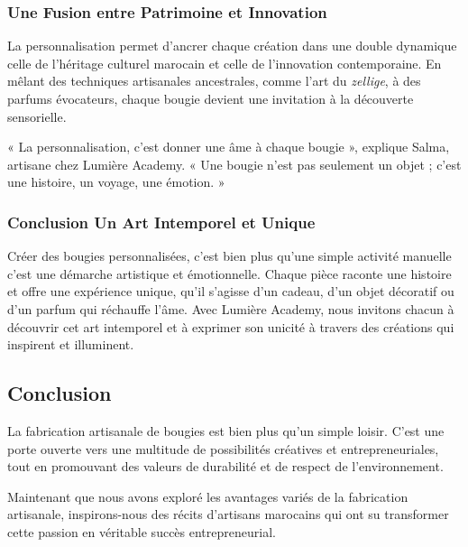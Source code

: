 \documentclass[11pt,fleqn,onecolumn,oneside]{book}
\begin{document}
\subsubsection*{Une Fusion entre Patrimoine et Innovation}

La personnalisation permet d’ancrer chaque création dans une double dynamique celle de l’héritage culturel marocain et celle de l’innovation contemporaine. En mêlant des techniques artisanales ancestrales, comme l’art du \textit{zellige}, à des parfums évocateurs, chaque bougie devient une invitation à la découverte sensorielle.

\begin{remark}
« La personnalisation, c’est donner une âme à chaque bougie », explique Salma, artisane chez Lumière Academy. « Une bougie n’est pas seulement un objet ; c’est une histoire, un voyage, une émotion. »
\end{remark}

\subsubsection*{Conclusion Un Art Intemporel et Unique}

Créer des bougies personnalisées, c’est bien plus qu’une simple activité manuelle c’est une démarche artistique et émotionnelle. Chaque pièce raconte une histoire et offre une expérience unique, qu’il s’agisse d’un cadeau, d’un objet décoratif ou d’un parfum qui réchauffe l’âme. Avec Lumière Academy, nous invitons chacun à découvrir cet art intemporel et à exprimer son unicité à travers des créations qui inspirent et illuminent.

\subsection*{Conclusion}

\begin{corollary}
La fabrication artisanale de bougies est bien plus qu’un simple loisir. C’est une porte ouverte vers une multitude de possibilités créatives et entrepreneuriales, tout en promouvant des valeurs de durabilité et de respect de l’environnement.
\end{corollary}

\begin{remark}
Maintenant que nous avons exploré les avantages variés de la fabrication artisanale, inspirons-nous des récits d’artisans marocains qui ont su transformer cette passion en véritable succès entrepreneurial.
\end{remark}
\end{document}

